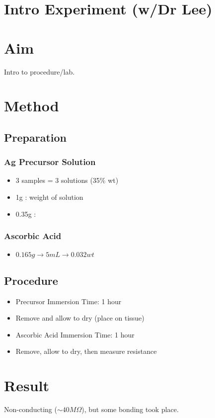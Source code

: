 \documentclass{article}
\begin{document}
\section*{Intro Experiment (w/Dr Lee)}

\section{Aim}
Intro to procedure/lab.

\section{Method}
\subsection{Preparation}
\subsubsection{Ag Precursor Solution}
\begin{itemize}
    \item 3 samples = 3 solutions (35\% wt)
    \item 1g : weight of solution
    \item 0.35g :  
\end{itemize}

\subsubsection{Ascorbic Acid}
\begin{itemize}
    \item $0.165g \rightarrow 5mL \rightarrow 0.032 wt$
\end{itemize}

\subsection{Procedure}
\begin{itemize}
    \item Precursor Immersion Time: 1 hour
    \item Remove and allow to dry (place on tissue)
    \item Ascorbic Acid Immersion Time: 1 hour
    \item Remove, allow to dry, then measure resistance
\end{itemize}



\section{Result}
Non-conducting ($\sim40M\Omega$), but some bonding took place.
\end{document}
